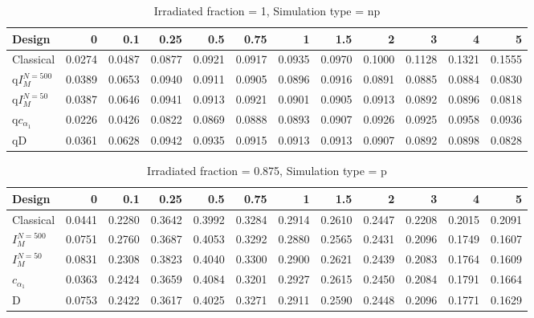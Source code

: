 \documentclass[a4paper]{article}
\begin{document}
\begin{table}[ht]
\centering
\begin{tabular}{lrrrrrrrrrrr}
  \hline
Design & 0 & 0.1 & 0.25 & 0.5 & 0.75 & 1 & 1.5 & 2 & 3 & 4 & 5 \\ 
  \hline
Classical & 0.0274 & 0.0487 & 0.0877 & 0.0921 & 0.0917 & 0.0935 & 0.0970 & 0.1000 & 0.1128 & 0.1321 & 0.1555 \\ 
  q$I_M^{N=500}$ & 0.0389 & 0.0653 & 0.0940 & 0.0911 & 0.0905 & 0.0896 & 0.0916 & 0.0891 & 0.0885 & 0.0884 & 0.0830 \\ 
  q$I_M^{N=50}$ & 0.0387 & 0.0646 & 0.0941 & 0.0913 & 0.0921 & 0.0901 & 0.0905 & 0.0913 & 0.0892 & 0.0896 & 0.0818 \\ 
  q$c_{\alpha_1}$ & 0.0226 & 0.0426 & 0.0822 & 0.0869 & 0.0888 & 0.0893 & 0.0907 & 0.0926 & 0.0925 & 0.0958 & 0.0936 \\ 
  qD & 0.0361 & 0.0628 & 0.0942 & 0.0935 & 0.0915 & 0.0913 & 0.0913 & 0.0907 & 0.0892 & 0.0898 & 0.0828 \\ 
   \hline
\end{tabular}
\caption{Irradiated fraction = 1, Simulation type = np} 
\end{table}

\begin{table}[ht]
\centering
\begin{tabular}{lrrrrrrrrrrr}
  \hline
Design & 0 & 0.1 & 0.25 & 0.5 & 0.75 & 1 & 1.5 & 2 & 3 & 4 & 5 \\ 
  \hline
Classical & 0.0441 & 0.2280 & 0.3642 & 0.3992 & 0.3284 & 0.2914 & 0.2610 & 0.2447 & 0.2208 & 0.2015 & 0.2091 \\ 
  $I_M^{N=500}$ & 0.0751 & 0.2760 & 0.3687 & 0.4053 & 0.3292 & 0.2880 & 0.2565 & 0.2431 & 0.2096 & 0.1749 & 0.1607 \\ 
  $I_M^{N=50}$ & 0.0831 & 0.2308 & 0.3823 & 0.4040 & 0.3300 & 0.2900 & 0.2621 & 0.2439 & 0.2083 & 0.1764 & 0.1609 \\ 
  $c_{\alpha_1}$ & 0.0363 & 0.2424 & 0.3659 & 0.4084 & 0.3201 & 0.2927 & 0.2615 & 0.2450 & 0.2084 & 0.1791 & 0.1664 \\ 
  D & 0.0753 & 0.2422 & 0.3617 & 0.4025 & 0.3271 & 0.2911 & 0.2590 & 0.2448 & 0.2096 & 0.1771 & 0.1629 \\ 
   \hline
\end{tabular}
\caption{Irradiated fraction = 0.875, Simulation type = p} 
\end{table}
\end{document}
